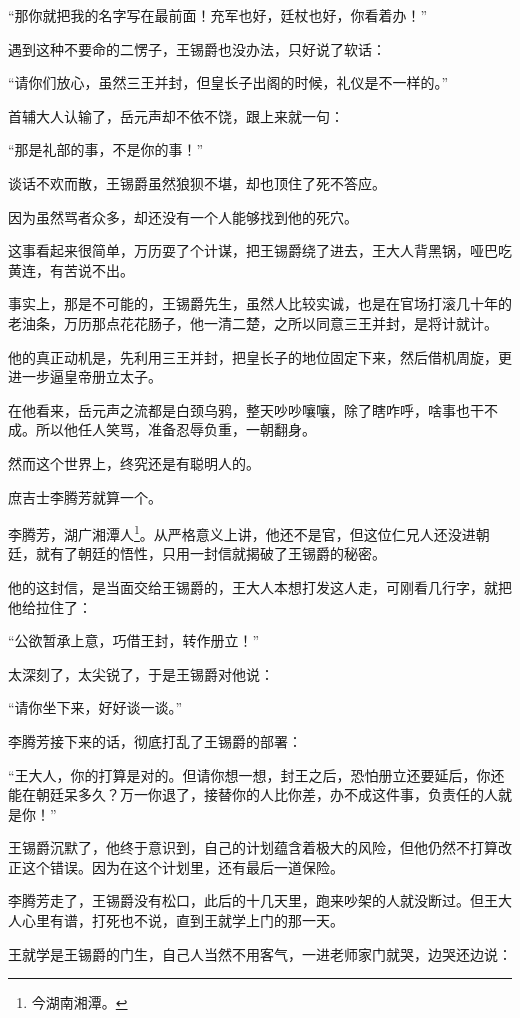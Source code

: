 \begin{multicols}{\theparacolNo}
“那你就把我的名字写在最前面！充军也好，廷杖也好，你看着办！”

遇到这种不要命的二愣子，王锡爵也没办法，只好说了软话：

“请你们放心，虽然三王并封，但皇长子出阁的时候，礼仪是不一样的。”

首辅大人认输了，岳元声却不依不饶，跟上来就一句：

“那是礼部的事，不是你的事！”

谈话不欢而散，王锡爵虽然狼狈不堪，却也顶住了死不答应。

因为虽然骂者众多，却还没有一个人能够找到他的死穴。

这事看起来很简单，万历耍了个计谋，把王锡爵绕了进去，王大人背黑锅，哑巴吃黄连，有苦说不出。

事实上，那是不可能的，王锡爵先生，虽然人比较实诚，也是在官场打滚几十年的老油条，万历那点花花肠子，他一清二楚，之所以同意三王并封，是将计就计。

他的真正动机是，先利用三王并封，把皇长子的地位固定下来，然后借机周旋，更进一步逼皇帝册立太子。

在他看来，岳元声之流都是白颈乌鸦，整天吵吵嚷嚷，除了瞎咋呼，啥事也干不成。所以他任人笑骂，准备忍辱负重，一朝翻身。

然而这个世界上，终究还是有聪明人的。

庶吉士李腾芳就算一个。

李腾芳，湖广湘潭人\footnote{今湖南湘潭。}。从严格意义上讲，他还不是官，但这位仁兄人还没进朝廷，就有了朝廷的悟性，只用一封信就揭破了王锡爵的秘密。

他的这封信，是当面交给王锡爵的，王大人本想打发这人走，可刚看几行字，就把他给拉住了：

“公欲暂承上意，巧借王封，转作册立！”

太深刻了，太尖锐了，于是王锡爵对他说：

“请你坐下来，好好谈一谈。”

李腾芳接下来的话，彻底打乱了王锡爵的部署：

“王大人，你的打算是对的。但请你想一想，封王之后，恐怕册立还要延后，你还能在朝廷呆多久？万一你退了，接替你的人比你差，办不成这件事，负责任的人就是你！”

王锡爵沉默了，他终于意识到，自己的计划蕴含着极大的风险，但他仍然不打算改正这个错误。因为在这个计划里，还有最后一道保险。

李腾芳走了，王锡爵没有松口，此后的十几天里，跑来吵架的人就没断过。但王大人心里有谱，打死也不说，直到王就学上门的那一天。

王就学是王锡爵的门生，自己人当然不用客气，一进老师家门就哭，边哭还边说：


\end{multicols}
